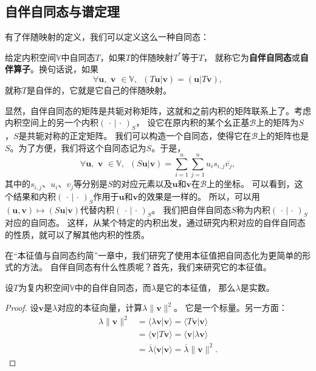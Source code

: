 \documentclass[12pt,UTF8]{ctexbook}
\begin{document}
\subsection{自伴自同态与谱定理}
有了伴随映射的定义，我们可以定义这么一种自同态：
\begin{df}\label{df:8_2}
    给定内积空间$\mathbb{V}$中自同态$T$，如果$T$的伴随映射$T^*$等于$T$，
    就称它为\textbf{自伴自同态}或\textbf{自伴算子}。换句话说，如果
    $$ \forall \mathbf{u}, \,\, \mathbf{v} \,\, \in \mathbb{V},\,\,\, (T\mathbf{u} | \mathbf{v}) = (\mathbf{u} | T\mathbf{v}), $$
    就称$T$是自伴的，它就是它自己的伴随映射。
\end{df}
显然，自伴自同态的矩阵是共轭对称矩阵，这就和之前内积的矩阵联系上了。考虑内积空间上的另一个内积$(\, \cdot \, | \, \cdot \,)_{S}$，
设它在原内积的某个幺正基$\mathcal{B}$上的矩阵为$S$，$S$是共轭对称的正定矩阵。
我们可以构造一个自同态，使得它在$\mathcal{B}$上的矩阵也是$S$。为了方便，我们将这个自同态记为$S$。于是，
$$ \forall \mathbf{u}, \,\, \mathbf{v} \,\, \in \mathbb{V},\,\,\, (S\mathbf{u} | \mathbf{v}) = \sum_{i=1}^n \sum_{j=1}^n u_i s_{i,j} \overline{v_j},$$
其中的$s_{i,j}$、$u_i$、$v_j$等分别是$S$的对应元素以及$\mathbf{u}$和$\mathbf{v}$在$\mathcal{B}$上的坐标。
可以看到，这个结果和内积$(\, \cdot \, | \, \cdot \,)_{S}$作用于$\mathbf{u}$和$\mathbf{v}$的效果是一样的。
所以，可以用$(\mathbf{u}, \mathbf{v} ) \mapsto (S\mathbf{u} | \mathbf{v}) $代替内积$(\, \cdot \, | \, \cdot \,)_{S}$。
我们把自伴自同态$S$称为内积$(\, \cdot \, | \, \cdot \,)_{S}$对应的自同态。
这样，从某个特定的内积出发，通过研究内积对应的自伴自同态的性质，就可以了解其他内积的性质。

在“本征值与自同态约简”一章中，我们研究了使用本征值把自同态化为更简单的形式的方法。
自伴自同态有什么性质呢？首先，我们来研究它的本征值。

\begin{pp}\label{pp:8_7}
    设$T$为复内积空间$\mathbb{V}$中的自伴自同态，而$\lambda$是它的本征值，
    那么$\lambda$是实数。
\end{pp}
\begin{proof} %
    设$\mathbf{v}$是$\lambda$对应的本征向量，计算$\lambda \|\mathbf{v}\|^2$。
    它是一个标量。另一方面：
    \begin{align*} 
        \lambda \|\mathbf{v}\|^2 &= \langle \lambda \mathbf{v} | \mathbf{v} \rangle = \langle T\mathbf{v} | \mathbf{v} \rangle  \\
        &= \langle \mathbf{v} | T \mathbf{v} \rangle = \langle \mathbf{v} | \lambda \mathbf{v} \rangle  \\
        &= \overline{\lambda} \langle \mathbf{v} | \mathbf{v} \rangle = \overline{\lambda} \|\mathbf{v}\|^2. 
    \end{align*}
\end{proof}
\end{document}
